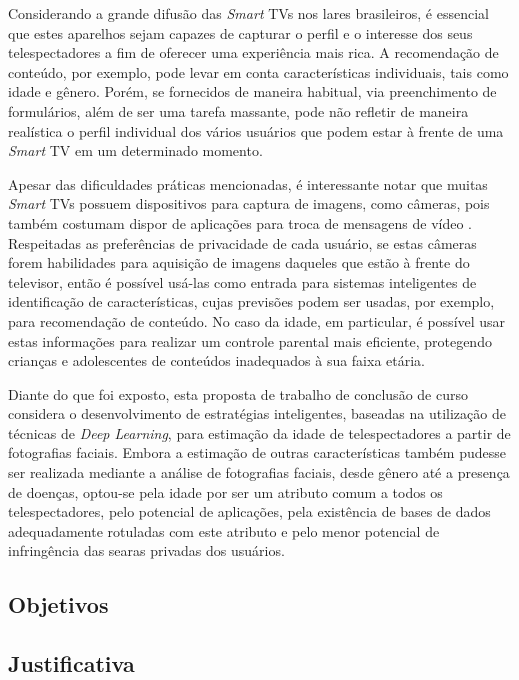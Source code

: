 Considerando a grande difusão das \emph{Smart} TVs nos lares brasileiros, é essencial que estes aparelhos sejam capazes de capturar o perfil e o interesse dos seus telespectadores a fim de oferecer uma experiência mais rica. A recomendação de conteúdo, por exemplo, pode levar em conta características individuais, tais como idade e gênero. Porém, se fornecidos de maneira habitual, via preenchimento de formulários, além de ser uma tarefa massante, pode não refletir de maneira realística o perfil individual dos vários usuários que podem estar à frente de uma \emph{Smart} TV em um determinado momento.

Apesar das dificuldades práticas mencionadas, é interessante notar que muitas \emph{Smart} TVs possuem dispositivos para captura de imagens, como câmeras, pois também costumam dispor de aplicações para troca de mensagens de vídeo \cite{Guardian:CameraSmartv}. Respeitadas as preferências de privacidade de cada usuário, se estas câmeras forem habilidades para aquisição de imagens daqueles que estão à frente do televisor, então é possível usá-las como entrada para sistemas inteligentes de identificação de características, cujas previsões podem ser usadas, por exemplo, para recomendação de conteúdo. No caso da idade, em particular, é possível usar estas informações para realizar um controle parental mais eficiente, protegendo crianças e adolescentes de conteúdos inadequados à sua faixa etária.

Diante do que foi exposto, esta proposta de trabalho de conclusão de curso considera o desenvolvimento de estratégias inteligentes, baseadas na utilização de técnicas de \emph{Deep Learning}, para estimação da idade de telespectadores a partir de fotografias faciais. Embora a estimação de outras características também pudesse ser realizada mediante a análise de fotografias faciais, desde gênero até a presença de doenças, optou-se pela idade por ser um atributo comum a todos os telespectadores, pelo potencial de aplicações, pela existência de bases de dados adequadamente rotuladas com este atributo e pelo menor potencial de infringência das searas privadas dos usuários.

\subsection{Objetivos}\label{sec:objetivo}


\subsection{Justificativa}\label{sec:just}


